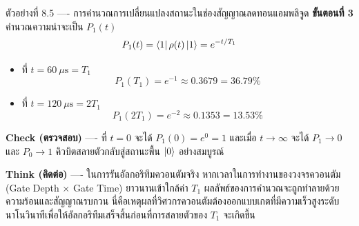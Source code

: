 \begin{psctbox}{ตัวอย่างที่ 8.5 ---- การคำนวณการเปลี่ยนแปลงสถานะในช่องสัญญาณลดทอนแอมพลิจูด}
\textbf{ขั้นตอนที่ 3} คำนวณความน่าจะเป็น $P_1(t)$
\begin{equation*}
P_1(t) = \bra{1}\rho(t)\ket{1} = e^{-t/T_1}
\end{equation*}
\begin{itemize}
    \item ที่ $t = 60~\mu\text{s} = T_1$
    \begin{equation*}
    P_1(T_1) = e^{-1} \approx 0.3679 = 36.79\%
    \end{equation*}
    \item ที่ $t = 120~\mu\text{s} = 2T_1$
    \begin{equation*}
    P_1(2T_1) = e^{-2} \approx 0.1353 = 13.53\%
    \end{equation*}
\end{itemize}

\textbf{Check (ตรวจสอบ)} ---- ที่ $t = 0$ จะได้ $P_1(0) = e^0 = 1$ และเมื่อ $t \to \infty$ จะได้ $P_1 \to 0$ และ $P_0 \to 1$ คิวบิตสลายตัวกลับสู่สถานะพื้น $\ket{0}$ อย่างสมบูรณ์

\textbf{Think (คิดต่อ)} ---- ในการรันอัลกอริทึมควอนตัมจริง หากเวลาในการทำงานของวงจรควอนตัม (Gate Depth $\times$ Gate Time) ยาวนานเข้าใกล้ค่า $T_1$ ผลลัพธ์ของการคำนวณจะถูกทำลายด้วยความร้อนและสัญญาณรบกวน นี่คือเหตุผลที่วิศวกรควอนตัมต้องออกแบบเกตที่มีความเร็วสูงระดับนาโนวินาทีเพื่อให้อัลกอริทึมเสร็จสิ้นก่อนที่การสลายตัวของ $T_1$ จะเกิดขึ้น
\end{psctbox}


